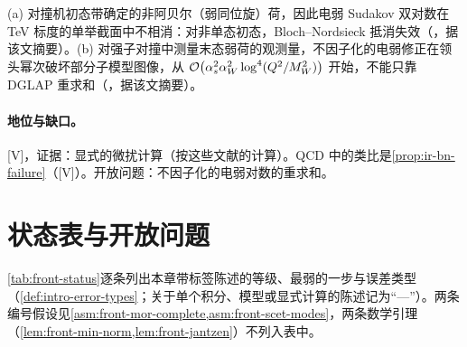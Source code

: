\begin{proposition}\label{prop:front-ew-violation}
(a) 对撞机初态带确定的非阿贝尔（弱同位旋）荷，因此电弱 Sudakov 双对数在 TeV 标度的单举截面中不相消：对非单态初态，Bloch--Nordsieck 抵消失效（\cite{Ciafaloni:2000df}，据该文摘要）。(b) 对强子对撞中测量末态弱荷的观测量，不因子化的电弱修正在领头幂次破坏部分子模型图像，从 $\mathcal{O}\!\left(\alpha_s^2\alpha_W^2\log^4(Q^2/M_W^2)\right)$ 开始，不能只靠 DGLAP 重求和（\cite{Baumgart:2018ntv}，据该文摘要）。
\end{proposition}

\paragraph{地位与缺口。}[V]，证据：显式的微扰计算（按这些文献的计算）。QCD 中的类比是\cref{prop:ir-bn-failure}（[V]）。开放问题：不因子化的电弱对数的重求和。

\section{状态表与开放问题}\label{sec:front-status}

\cref{tab:front-status}逐条列出本章带标签陈述的等级、最弱的一步与误差类型（\cref{def:intro-error-types}；关于单个积分、模型或显式计算的陈述记为“—”）。两条编号假设见\cref{asm:front-mor-complete,asm:front-scet-modes}，两条数学引理（\cref{lem:front-min-norm,lem:front-jantzen}）不列入表中。

